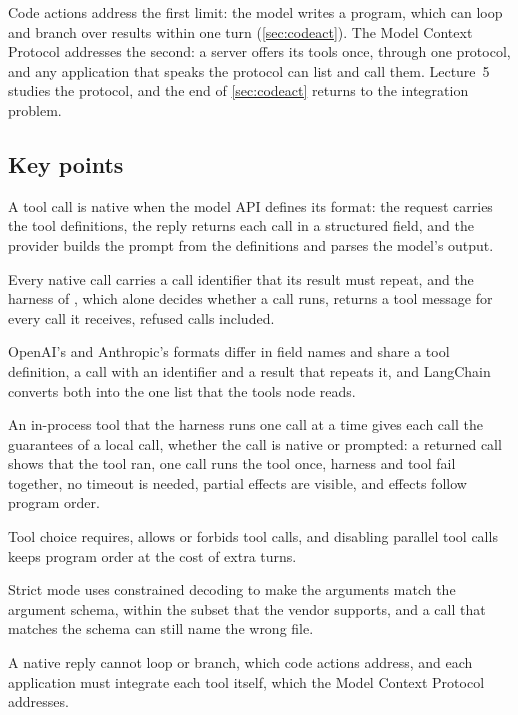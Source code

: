 Code actions address the first limit: the model writes a program, which can loop and branch over
results within one turn (\cref{sec:codeact}). The Model Context Protocol addresses the second: a
server offers its tools once, through one protocol, and any application that speaks the protocol can
list and call them. Lecture~5 studies the protocol, and the end of \cref{sec:codeact} returns to the
integration problem.

\subsection*{Key points}
\bi
\item A tool call is native when the model API defines its format: the request carries the tool
definitions, the reply returns each call in a structured field, and the provider builds the prompt
from the definitions and parses the model's output.
\item Every native call carries a call identifier that its result must repeat, and the harness of
\msa{}, which alone decides whether a call runs, returns a tool message for every call it receives,
refused calls included.
\item OpenAI's and Anthropic's formats differ in field names and share a tool definition, a call with
an identifier and a result that repeats it, and LangChain converts both into the one list that the
tools node reads.
\item An in-process tool that the harness runs one call at a time gives each call the guarantees of
a local call, whether the call is native or prompted: a returned call shows that the tool ran, one
call runs the tool once, harness and tool fail together, no timeout is needed, partial effects are
visible, and effects follow program order.
\item Tool choice requires, allows or forbids tool calls, and disabling parallel tool calls keeps
program order at the cost of extra turns.
\item Strict mode uses constrained decoding to make the arguments match the argument schema, within
the subset that the vendor supports, and a call that matches the schema can still name the wrong
file.
\item A native reply cannot loop or branch, which code actions address, and each application must
integrate each tool itself, which the Model Context Protocol addresses.
\ei
